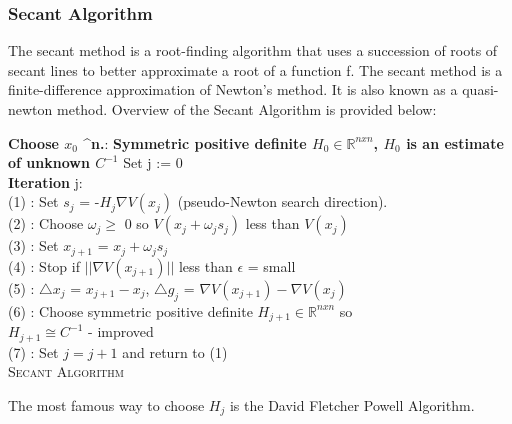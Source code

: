 \subsubsection{Secant Algorithm}
The secant method is a root-finding algorithm that uses a succession of roots of secant lines to better approximate a root of a function f. The secant method is a finite-difference approximation of Newton's method. It is also known as a quasi-newton method. Overview of the Secant Algorithm is provided below: 
\SetAlgoLined
\DontPrintSemicolon
\begin{algorithm}[H]
   \textbf{Choose $x_{0}$ \in {}^{n}.}: \newline
   \textbf{Symmetric positive definite $H_{0} \in \mathbb{R}^{n x n}$, $H_{0}$ is an estimate of unknown $C^{-1}$}\newline 
   Set \hspace{2mm} j := 0 \\
   \textbf{Iteration} \hspace{2mm} j: \\
   (1) : Set \hspace{2mm} $s_{j}$ = -$H_{j}\nabla V(x_{j})$ (pseudo-Newton search direction). \\
   (2) : Choose $\omega_{j} \geq$ 0 so $V(x_{j} + \omega_{j}s_{j})$ less than $V(x_{j})$ \\
   (3) : Set $x_{j+1}$ = $x_{j} + \omega_{j}s_{j}$ \\
   (4) : Stop if $||\nabla V(x_{j+1})||$ less than $\epsilon$ = small \\
   (5) : $\triangle x_{j}$ = $x_{j+1} - x_{j}$, $\triangle g_{j}$ = $\nabla V(x_{j+1}) - \nabla V(x_{j})$ \\
   (6) : Choose symmetric positive definite $H_{j+1} \in \mathbb{R}^{nxn}$ so \\
   $H_{j+1} \cong C^{-1}$ - improved \\
   (7) : Set $j = j+1$ and return to (1) \\
  \caption{\textsc{Secant Algorithm}}
\end{algorithm}
The most famous way to choose $H_{j}$ is the David Fletcher Powell Algorithm. 


